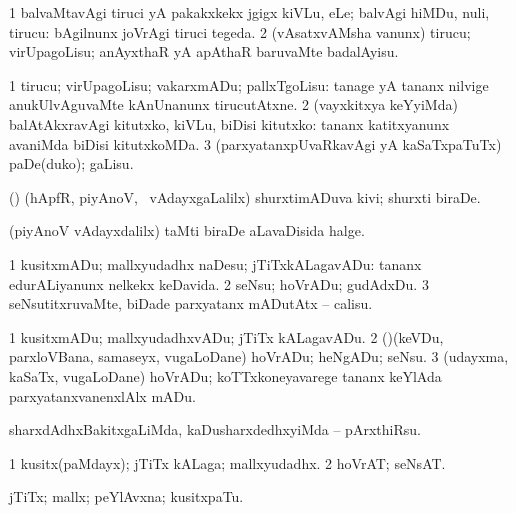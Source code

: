 {{{{{{\begin{center}
{{\bentry
{} 
\gl{\sakirx}
\expl{}
\bmng
\bnum
\num{1} balvaMtavAgi tiruci yA pakakxkekx jgigx kiVLu, eLe; balvAgi hiMDu, nuli, tirucu:  bAgilnunx joVrAgi tiruci tegeda. 
\num{2} (vAsatxvAMsha \mo vanunx) tirucu; virUpagoLisu; anAyxthaR yA apAthaR baruvaMte badalAyisu. 
\enum
\emng
\eentry

\bentry
{} 
\gl{\sakirx}
\expl{}
\bmng
\bnum
\num{1} tirucu; virUpagoLisu; vakarxmADu; pallxTgoLisu:  tanage yA tananx nilvige anukUlvAguvaMte kAnUnanunx tirucutAtxne. 
\num{2} (vayxkitxya keYyiMda) balAtAkxravAgi kitutxko, kiVLu, biDisi kitutxko:  tananx katitxyanunx avaniMda biDisi kitutxkoMDa. 
\num{3} (parxyatanxpUvaRkavAgi yA kaSaTxpaTuTx) paDe(duko); gaLisu. 
\enum
\emng
\eentry

\bentry
{} 
\gl{\nA}
\expl{}
\bmng
(\pArxparx) (hApfR, piyAnoV, \mo\ vAdayxgaLalilx) shurxtimADuva kivi; shurxti biraDe. 
\emng
\eentry

\bentry
{} 
\gl{\nA}
\expl{}
\bmng
(piyAnoV vAdayxdalilx) taMti biraDe aLavaDisida halge. 
\emng
\eentry

\bentry 
{} 
\gl{\sakirx}
\expl{}
\bmng
\bnum
\num{1} kusitxmADu; mallxyudadhx naDesu; jTiTxkALagavADu:  tananx edurALiyanunx nelkekx keDavida. 
\num{2} seNsu; hoVrADu; gudAdxDu. 
\num{3} seNsutitxruvaMte, biDade parxyatanx mADutAtx -- calisu. 
\enum
\emng

\noindent
\gl{\akirx}
\expl{}
\bmng
\bnum
\num{1} kusitxmADu; mallxyudadhxvADu; jTiTx kALagavADu. 
\num{2} (\rUpa)(keVDu, parxloVBana, samaseyx, \mo vugaLoDane) hoVrADu; heNgADu; seNsu. 
\num{3} (udayxma, kaSaTx, \mo vugaLoDane) hoVrADu; koTTxkoneyavarege tananx keYlAda parxyatanxvanenxlAlx mADu. 
\enum
\emng

\noindent
\gl{\pagu}
\expl{}
\bmng
{} sharxdAdhxBakitxgaLiMda, kaDusharxdedhxyiMda -- pArxthiRsu. 
\emng
\eentry

\bentry 
{} 
\gl{\nA}
\expl{}
\bmng
\bnum
\num{1} kusitx(paMdayx); jTiTx kALaga; mallxyudadhx. 
\num{2} hoVrAT; seNsAT. 
\enum
\emng
\eentry

\bentry
{} 
\gl{\nA}
\expl{}
\bmng
jTiTx; mallx; peYlAvxna; kusitxpaTu. 
\emng
\eentry

}}
\end{center}}}}}}}
